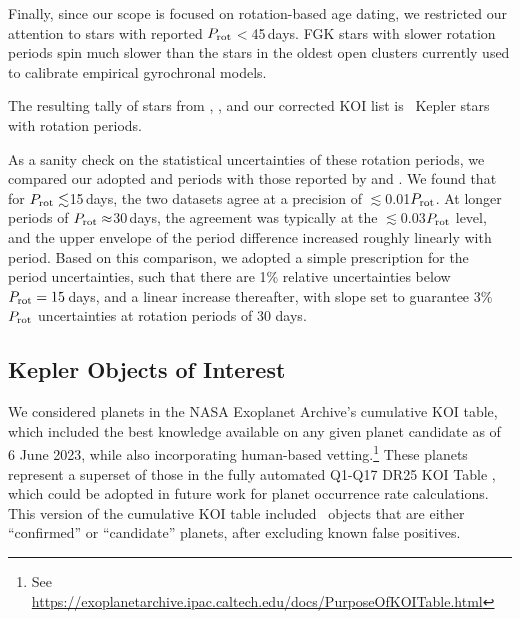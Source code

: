 \documentclass[11pt,twocolumn,tighten]{aastex63}
\newcommand{\nkoiswithprot}{{$\sim$2{,}000}}
\newcommand{\nkoisnofpwithprot}{{$\sim$1{,}000}}
\begin{document}
Finally, since our scope is focused on rotation-based age dating, 
we restricted our attention to stars with reported $P_{\rm
rot}$$<$45\,days.
FGK stars with slower rotation periods spin much slower than the stars
in the oldest open clusters currently used to calibrate empirical
gyrochronal models.

The resulting tally of stars from
, , and our corrected
KOI list is \nuniqstarsantosrot\ Kepler stars with rotation periods.

As a sanity check on the statistical uncertainties of these rotation
periods, we compared our adopted  and
 periods with those reported by
\citet{McQuillan_2014} and \citet{Mazeh_2015}.  We found that for
$P_{\rm rot}\lesssim$15\,days, the two datasets agree at a precision
of $\lesssim$0.01$P_{\rm rot}$.  At longer periods of $P_{\rm
rot}\approx$30\,days, the agreement was typically at the
$\lesssim$0.03$P_{\rm rot}$ level, and the upper envelope of the
period difference increased roughly linearly with period.  Based on
this comparison, we adopted a simple prescription for the period
uncertainties, such that there are 1\% relative uncertainties below
$P_{\rm rot}=15$\,days, and a linear increase thereafter, with slope
set to guarantee 3\% $P_{\rm rot}$ uncertainties at rotation periods
of 30 days.


\subsection{Kepler Objects of Interest}
\label{subsec:planetsel}

We considered planets in the NASA Exoplanet Archive's cumulative KOI
table, which included the best knowledge available on any given planet
candidate as of 6 June 2023, while also incorporating human-based
vetting.\footnote{See
\url{https://exoplanetarchive.ipac.caltech.edu/docs/PurposeOfKOITable.html}}
These planets represent a superset of those in the fully automated
Q1-Q17 DR25 KOI Table \citep{Thompson_2018}, which could be adopted in
future work for planet occurrence rate calculations.  This version of
the cumulative KOI table included \nkoisnofp\ objects that are either
``confirmed'' or ``candidate'' planets, after excluding known false
positives. 

\end{document}
